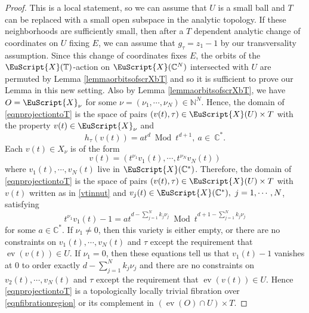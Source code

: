 \documentclass[11pt]{amsart}
\newcommand{\scrX}{\EuScript{X}}
\newcommand{\bC}{\mathbb{C}}
\newcommand{\bN}{\mathbb{N}}
\numberwithin{equation}{section}
\newcommand{\C}{\mathbb C}
\newcommand{\bT}{\mathbb{T}}
\newcommand{\ev}{\operatorname{ev}}
\newcommand{\Mod}{\operatorname{Mod}}
\begin{document}
\begin{proof}
	This is a local statement, so we can assume that $U$ is a small ball and $T$ can be replaced with a small open subspace in the analytic topology.
	If these neighborhoods are sufficiently small, then after a $T$ dependent analytic change of coordinates on $U$ fixing $E$, we can assume that $g_\tau = z_1 - 1$ by our transversality assumption.
	Since this change of coordinates fixes $E$, the orbits of the $\scrX(\bT)$-action on $\scrX(\bC^N)$ intersected with $U$ are permuted by Lemma \ref{lemmaorbitsofscrXbT} and so it is sufficient to prove our Lemma in this new setting.
	Also by Lemma \ref{lemmaorbitsofscrXbT}, we have  $O = \scrX_\nu$ for some $\nu = (\nu_1,\cdots,\nu_N) \in \bN^N$.
	Hence, the domain of \eqref{eqnprojectiontoT}
	is the space of pairs $(v(t),\tau) \in \scrX(U) \times T$ with
	the property $v(t) \in \scrX_\nu$ and
	\begin{equation} \label{eqnhtvanishes}
		h_\tau(v(t)) = a t^d \ \Mod \ t^{d+1}, \ a \in \ \bC^*.
	\end{equation}
	Each $v(t) \in X_\nu$ is of the form
	\begin{equation} \label{vtinnut}
		v(t) = (t^{\nu_1} v_1(t),\cdots, t^{\nu_N} v_N(t))
	\end{equation}
	where $v_1(t),\cdots,v_N(t)$ live in $\scrX(\bC^*)$.
	Therefore, the domain of \eqref{eqnprojectiontoT} is the space of pairs $(v(t),\tau) \in \scrX(U) \times T$ with $v(t)$ written as in \eqref{vtinnut} and $v_j(t) \in \scrX(\bC^*), \ j=1,\cdots,N$, satisfying
	\begin{equation}
		t^{\nu_1} v_1(t) - 1 = a t^{d- \sum_{j=1}^N k_j \nu_j} \ \Mod \ t^{d+1 - \sum_{j=1}^N k_j \nu_j}
	\end{equation}
	for some $a \in \C^*$.
	If $\nu_1 \neq 0$, then this variety is either empty, or there are no constraints on $v_1(t),\cdots,v_N(t)$
	and $\tau$ except the requirement that $\ev(v(t)) \in U$.
	If $\nu_1 = 0$, then these equations tell us that $v_1(t)-1$ vanishes at $0$ to order exactly $d- \sum_{j=1}^N k_j \nu_j$ and there are no constraints on $v_2(t),\cdots,v_N(t)$ and $\tau$ except the requirement that $\ev(v(t)) \in U$.
	Hence \eqref{eqnprojectiontoT} is a topologically locally trivial fibration over \eqref{eqnfibrationregion} or its complement in $(\ev(O) \cap U) \times T$.
\end{proof}
\end{document}
